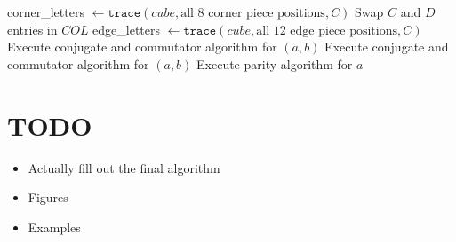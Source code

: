\documentclass{article}
\begin{document}
\begin{algorithm}[!h]
\begin{algorithmic}
        \State corner\_letters $\gets\texttt{trace}(cube, \text{all 8 corner piece positions}, C)$ 
         
            \State Swap $C$ and $D$ entries in $COL$
        \EndIf
        \State edge\_letters $\gets\texttt{trace}(cube, \text{all 12 edge piece positions}, C)$
         
            \State Execute conjugate and commutator algorithm for $(a,b)$
        \EndFor
         
            \State Execute conjugate and commutator algorithm for $(a,b)$
        \EndFor
         
            \State Execute parity algorithm for $a$
        \EndIf
    \EndFunction
    \end{algorithmic}
\end{algorithm}

\newpage
\section{TODO}
\begin{itemize}
    \item Actually fill out the final algorithm
    \item Figures
    \item Examples
\end{itemize}
\end{document}
